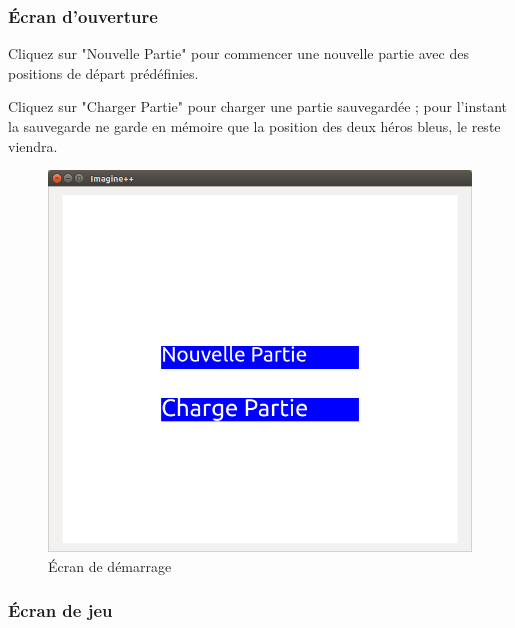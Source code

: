 \documentclass[11pt,a4paper]{article}
\begin{document}
\subsubsection{Écran d'ouverture}

Cliquez sur "Nouvelle Partie" pour commencer une nouvelle partie avec des positions de départ prédéfinies.

Cliquez sur "Charger Partie" pour charger une partie sauvegardée ; pour l'instant la sauvegarde ne garde en mémoire que la position des deux héros bleus, le reste viendra.

\begin{figure}[h]
\begin{center}
\includegraphics[scale=0.5]{./ecran_de_demarrage.png}
\caption{Écran de démarrage}
\end{center}
\end{figure}

\clearpage

\subsubsection{Écran de jeu}
\end{document}
